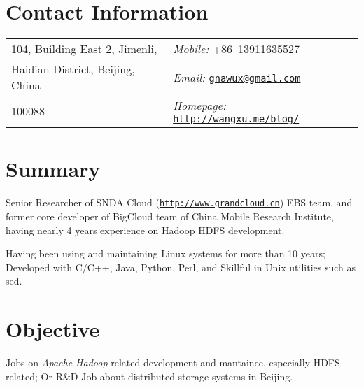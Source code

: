 \documentclass[a4paper,margin,line]{res}
\newcommand{\http}{http:/\hspace{-0.3ex}/}
\begin{document}

\begin{resume}

\section{\sc Contact Information}
\vspace{.05in}
\begin{tabular}{@{}p{2.9in}|p{2.5in}}
104, Building East 2, Jimenli,          & \textit{Mobile:} +86~13911635527\\
Haidian District, Beijing, China        & \textit{Email:}  \href{mailto:gnawux@gmail.com}{\tt gnawux@gmail.com} \\
100088                                  & \textit{Homepage:} \href{http://wangxu.me/blog/}{\tt \http{}wangxu.me/blog/} \\
                                                                   
\end{tabular}

\section{\sc Summary}

Senior Researcher of SNDA Cloud (\href{http://www.grandcloud.cn}{\tt \http{}www.grandcloud.cn}) EBS team, and former core developer of BigCloud team of China Mobile Research Institute, having nearly 4 years experience on Hadoop HDFS development. 

Having been using and maintaining Linux systems for more than 10 years; Developed with C/C++, Java, Python, Perl, and Skillful in Unix utilities such as sed.

\section{\sc Objective}
Jobs on {\sl Apache Hadoop} related development and mantaince, especially HDFS related; Or R\&D Job about distributed storage systems in Beijing.


\end{resume}
\end{document}
